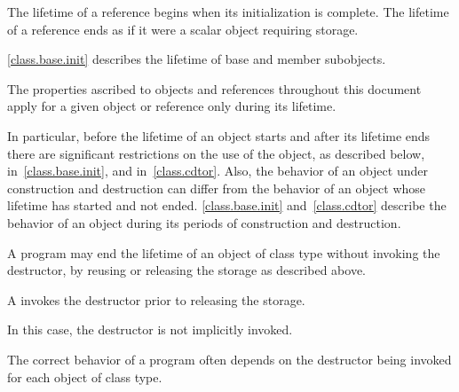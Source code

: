\pnum
{}%
The lifetime of a reference begins when its initialization is complete.
The lifetime of a reference ends as if it were a scalar object requiring storage.

\pnum
\begin{note}
\ref{class.base.init}
describes the lifetime of base and member subobjects.
\end{note}

\pnum
The properties ascribed to objects and references throughout this document
apply for a given object or reference only during its lifetime.
\begin{note}
In particular, before the lifetime of an object starts and after its
lifetime ends there are significant restrictions on the use of the
object, as described below, in~\ref{class.base.init}, and
in~\ref{class.cdtor}. Also, the behavior of an object under construction
and destruction can differ from the behavior of an object whose
lifetime has started and not ended. \ref{class.base.init}
and~\ref{class.cdtor} describe the behavior of an object during its periods
of construction and destruction.
\end{note}

\pnum
A program may end the lifetime of an object of class type without invoking the
destructor, by reusing or releasing the storage as described above.
\begin{note}
A  invokes the destructor
prior to releasing the storage.
\end{note}
In this case, the destructor is not implicitly invoked.
\begin{note}
The correct behavior of a program often depends on
the destructor being invoked for each object of class type.
\end{note}

